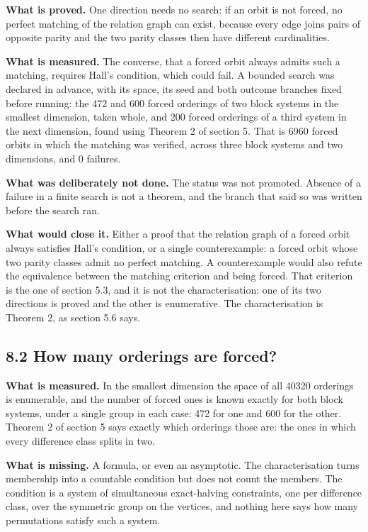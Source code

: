 \documentclass[11pt,a4paper]{article}
\begin{document}
\textbf{What is proved.} One direction needs no search: if an orbit is not forced, no perfect matching of the relation graph can exist, because every edge joins pairs of opposite parity and the two parity classes then have different cardinalities.

\textbf{What is measured.} The converse, that a forced orbit always admits such a matching, requires Hall's condition, which could fail. A bounded search was declared in advance, with its space, its seed and both outcome branches fixed before running: the 472 and 600 forced orderings of two block systems in the smallest dimension, taken whole, and 200 forced orderings of a third system in the next dimension, found using Theorem 2 of section 5. That is 6960 forced orbits in which the matching was verified, across three block systems and two dimensions, and 0 failures.

\textbf{What was deliberately not done.} The status was not promoted. Absence of a failure in a finite search is not a theorem, and the branch that said so was written before the search ran.

\textbf{What would close it.} Either a proof that the relation graph of a forced orbit always satisfies Hall's condition, or a single counterexample: a forced orbit whose two parity classes admit no perfect matching. A counterexample would also refute the equivalence between the matching criterion and being forced. That criterion is the one of section 5.3, and it is not the characterisation: one of its two directions is proved and the other is enumerative. The characterisation is Theorem 2, as section 5.6 says.

\subsection*{8.2 How many orderings are forced?}

\textbf{What is measured.} In the smallest dimension the space of all 40320 orderings is enumerable, and the number of forced ones is known exactly for both block systems, under a single group in each case: 472 for one and 600 for the other. Theorem 2 of section 5 says exactly which orderings those are: the ones in which every difference class splits in two.

\textbf{What is missing.} A formula, or even an asymptotic. The characterisation turns membership into a countable condition but does not count the members. The condition is a system of simultaneous exact-halving constraints, one per difference class, over the symmetric group on the vertices, and nothing here says how many permutations satisfy such a system.
\end{document}
